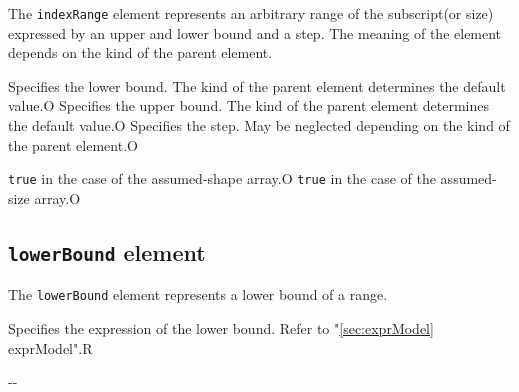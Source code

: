 The {\tt indexRange} element represents an arbitrary range of the subscript(or size) expressed by an upper and lower bound and a step.
The meaning of the element depends on the kind of the parent element.


\begin{XcodeMLChildElements}
{Specifies the lower bound. The kind of the parent element determines the default value.}{O}
{Specifies the upper bound. The kind of the parent element determines the default value.}{O}
{Specifies the step. May be neglected depending on the kind of the parent element.}{O}
\end{XcodeMLChildElements}

\begin{XcodeMLAttributes}
{{\tt true} in the case of the assumed-shape array.}{O}
{{\tt true} in the case of the assumed-size array.}{O}
\end{XcodeMLAttributes}


\subsection{ {\tt lowerBound} element}

The {\tt lowerBound} element represents a lower bound of a range.


\begin{XcodeMLChildElements}
{Specifies the expression of the lower bound. Refer to "\ref{sec:exprModel} exprModel".}{R}
\end{XcodeMLChildElements}

\begin{XcodeMLAttributes}
\XcodeMLAttrDef{-}{-}
{-}{-}
\end{XcodeMLAttributes}


